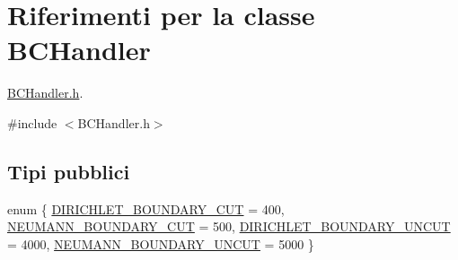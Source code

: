 \hypertarget{classBCHandler}{\section{Riferimenti per la classe B\-C\-Handler}
\label{classBCHandler}
}


\hyperlink{BCHandler_8h}{B\-C\-Handler.\-h}.  




{\ttfamily \#include $<$B\-C\-Handler.\-h$>$}

\subsection*{Tipi pubblici}
\begin{DoxyCompactItemize}
\item 
enum \{ \hyperlink{classBCHandler_a2bc86209db0836dbc6ca56e1ca4e4ac1a57ea96455b2ba998cc42a21aa7e1d842}{D\-I\-R\-I\-C\-H\-L\-E\-T\-\_\-\-B\-O\-U\-N\-D\-A\-R\-Y\-\_\-\-C\-U\-T} = 400, 
\hyperlink{classBCHandler_a2bc86209db0836dbc6ca56e1ca4e4ac1add7397a06718591b0c27c067225b1d5f}{N\-E\-U\-M\-A\-N\-N\-\_\-\-B\-O\-U\-N\-D\-A\-R\-Y\-\_\-\-C\-U\-T} = 500, 
\hyperlink{classBCHandler_a2bc86209db0836dbc6ca56e1ca4e4ac1a487ba8af2086045d8b0df840b2525866}{D\-I\-R\-I\-C\-H\-L\-E\-T\-\_\-\-B\-O\-U\-N\-D\-A\-R\-Y\-\_\-\-U\-N\-C\-U\-T} = 4000, 
\hyperlink{classBCHandler_a2bc86209db0836dbc6ca56e1ca4e4ac1aa538eee48606669ac37073ca65144007}{N\-E\-U\-M\-A\-N\-N\-\_\-\-B\-O\-U\-N\-D\-A\-R\-Y\-\_\-\-U\-N\-C\-U\-T} = 5000
 \}
\end{DoxyCompactItemize}
